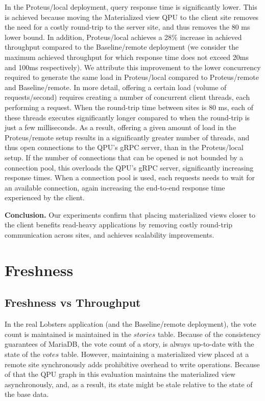 In the Proteus/local deployment, query response time is significantly lower.
This is achieved because moving the Materialized view QPU to the client site removes the need for a costly round-trip to
the server site, and thus removes the 80 ms lower bound.
In addition, Proteus/local achieves a 28\% increase in achieved throughput compared to the Baseline/remote deployment
(we consider the maximum achieved throughput for which response time does not exceed 20ms and 100ms respectively).
We attribute this improvement to the lower concurrency required to generate the same load in Proteus/local
compared to Proteus/remote and Baseline/remote.
In more detail, offering a certain load (volume of requests/second) requires creating a number of concurrent client threads,
each performing a request.
When the round-trip time between sites is 80 ms, each of these threads executes significantly longer compared to
when the round-trip is just a few milliseconds.
As a result, offering a given amount of load in the Proteus/remote setup results in a significantly greater number
of threads, and thus open connections to the QPU's gRPC server, than in the Proteus/local setup.
If the number of connections that can be opened is not bounded by a connection pool, this overloads the QPU's gRPC server,
significantly increasing response times.
When a connection pool is used, each requests needs to wait for an available connection,
again increasing the end-to-end response time experienced by the client.

\medskip
\noindent
\textbf{Conclusion.} Our experiments confirm that placing materialized views closer to the client benefits read-heavy applications
by removing costly round-trip communication across sites, and achieves scalability improvements.


\section{Freshness}
\label{sec:eval_freshness}

\subsection{Freshness vs Throughput}
\label{sec:eval_freshness_throughput}

In the real Lobsters application (and the Baseline/remote deployment),
the vote count is maintained is maintained in the $stories$ table.
Because of the consistency guarantees of MariaDB,
the vote count of a story, is always up-to-date with the state of the $votes$ table.
However, maintaining a materialized view placed at a remote site synchronously adds prohibitive overhead to write operations.
Because of that the QPU graph in this evaluation maintains the materialized view asynchronously, and, as a result,
its state might be stale relative to the state of the base data.

